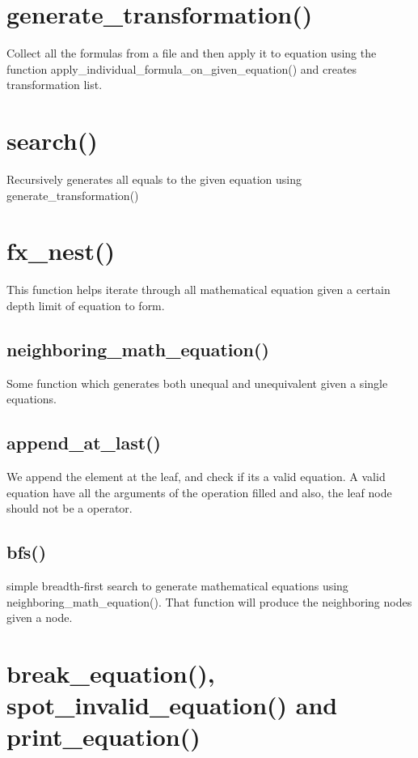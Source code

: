 \documentclass{book}
\begin{document}
\section{generate\_transformation()}

Collect all the formulas from a file and then apply it to equation using the function apply\_individual\_formula\_on\_given\_equation() and creates transformation list.

\section{search()}

Recursively generates all equals to the given equation using generate\_transformation()

\section{fx\_nest()}

This function helps iterate through all mathematical equation given a certain depth limit of equation to form.

\subsection{neighboring\_math\_equation()}

Some function which generates both unequal and unequivalent given a single equations.

\subsection{append\_at\_last()}

We append the element at the leaf, and check if its a valid equation. A valid equation have all the arguments of the operation filled and also, the leaf node should not be a operator.

\subsection{bfs()}

simple breadth-first search to generate mathematical equations using neighboring\_math\_equation(). That function will produce the neighboring nodes given a node.

\section{break\_equation(), spot\_invalid\_equation() and print\_equation()}
\end{document}
